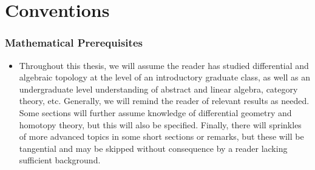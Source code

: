 \chapter*{Conventions}


\subsection*{Mathematical Prerequisites}

\begin{itemize}
  \item Throughout this thesis, we will assume the reader has studied differential and algebraic topology at the level of an introductory graduate class, as well as an undergraduate level understanding of abstract and linear algebra, category theory, etc. Generally, we will remind the reader of relevant results as needed.
  Some sections will further assume knowledge of differential geometry and homotopy theory, but this will also be specified. Finally, there will sprinkles of more advanced topics in some short sections or remarks, but these will be tangential and may be skipped without consequence by a reader lacking sufficient background.
\end{itemize}

